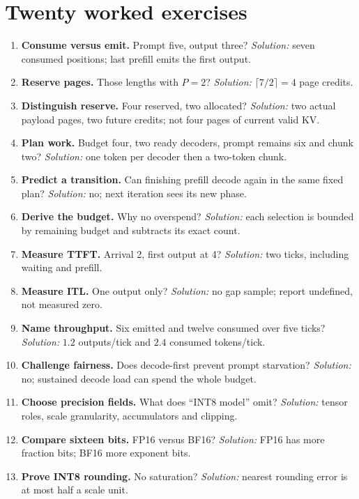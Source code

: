 \section{Twenty worked exercises}
\label{evod37:exercises}
\begin{enumerate}
\setlength{\itemsep}{1pt}
\setlength{\parsep}{0pt}
\item \textbf{Consume versus emit.} Prompt five, output three?
\emph{Solution:} seven consumed positions; last prefill emits the first output.
\item \textbf{Reserve pages.} Those lengths with $P=2$?
\emph{Solution:} $\lceil7/2\rceil=4$ page credits.
\item \textbf{Distinguish reserve.} Four reserved, two allocated?
\emph{Solution:} two actual payload pages, two future credits; not four
pages of current valid KV.
\item \textbf{Plan work.} Budget four, two ready decoders, prompt remains
six and chunk two? \emph{Solution:} one token per decoder then a two-token chunk.
\item \textbf{Predict a transition.} Can finishing prefill decode again in
the same fixed plan? \emph{Solution:} no; next iteration sees its new phase.
\item \textbf{Derive the budget.} Why no overspend? \emph{Solution:}
each selection is bounded by remaining budget and subtracts its exact count.
\item \textbf{Measure TTFT.} Arrival 2, first output at 4?
\emph{Solution:} two ticks, including waiting and prefill.
\item \textbf{Measure ITL.} One output only? \emph{Solution:} no gap sample;
report undefined, not measured zero.
\item \textbf{Name throughput.} Six emitted and twelve consumed over five
ticks? \emph{Solution:} $1.2$ outputs/tick and $2.4$ consumed tokens/tick.
\item \textbf{Challenge fairness.} Does decode-first prevent prompt starvation?
\emph{Solution:} no; sustained decode load can spend the whole budget.
\item \textbf{Choose precision fields.} What does ``INT8 model'' omit?
\emph{Solution:} tensor roles, scale granularity, accumulators and clipping.
\item \textbf{Compare sixteen bits.} FP16 versus BF16?
\emph{Solution:} FP16 has more fraction bits; BF16 more exponent bits.
\item \textbf{Prove INT8 rounding.} No saturation?
\emph{Solution:} nearest rounding error is at most half a scale unit.

\end{enumerate}
